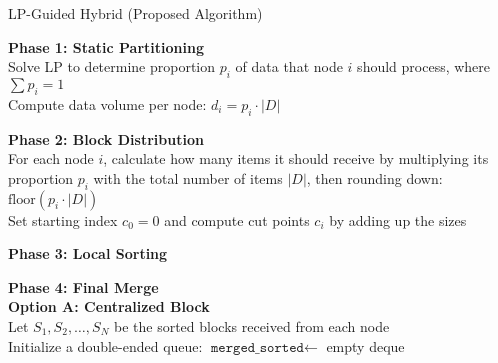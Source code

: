 \documentclass[]{interact}
\theoremstyle{plain}
\theoremstyle{definition}
\theoremstyle{remark}
\begin{document}
\begin{algorithm}[H]
\caption{LP-Guided Hybrid (Proposed Algorithm)}



\textbf{Phase 1: Static Partitioning} \\
Solve LP to determine proportion $p_i$ of data that node $i$ should process, where $\sum p_i = 1$ \\
Compute data volume per node: $d_i = p_i \cdot |D|$

\textbf{Phase 2: Block Distribution} \\
For each node $i$, calculate how many items it should receive by multiplying its proportion $p_i$ with the total number of items $|D|$, then rounding down: $\text{floor}(p_i \cdot |D|)$ \\
Set starting index $c_0 = 0$ and compute cut points $c_i$ by adding up the sizes \\


\textbf{Phase 3: Local Sorting} \\

\textbf{Phase 4: Final Merge} \\

\textbf{Option A: Centralized Block} \\
Let $S_1, S_2, \ldots, S_N$ be the sorted blocks received from each node \\
Initialize a double-ended queue: $\texttt{merged\_sorted} \leftarrow$ empty deque \\


\end{algorithm}
\end{document}
